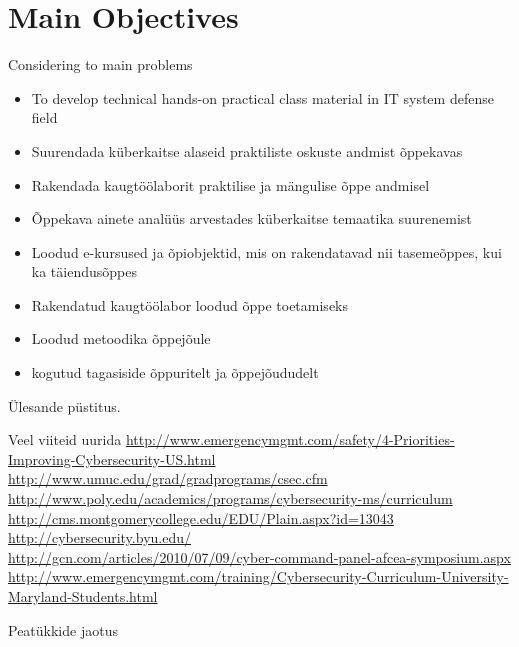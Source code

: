 \section{Main Objectives}
Considering to main problems
\begin{itemize}
	\item To develop technical hands-on practical class material in IT system defense field
	\item Suurendada küberkaitse alaseid praktiliste oskuste andmist õppekavas
	\item Rakendada kaugtöölaborit praktilise ja mängulise õppe andmisel
\end{itemize}


\begin{itemize}
	\item Õppekava ainete analüüs arvestades küberkaitse temaatika suurenemist
	\item Loodud e-kursused ja õpiobjektid, mis on rakendatavad nii tasemeõppes, kui ka täiendusõppes
	\item Rakendatud kaugtöölabor loodud õppe toetamiseks
	\item Loodud metoodika õppejõule
	\item kogutud tagasiside õppuritelt ja õppejõududelt
\end{itemize}

Ülesande püstitus.

Veel viiteid uurida 
\url{http://www.emergencymgmt.com/safety/4-Priorities-Improving-Cybersecurity-US.html}\\
\url{http://www.umuc.edu/grad/gradprograms/csec.cfm}
\\
\url{http://www.poly.edu/academics/programs/cybersecurity-ms/curriculum}\\
\url{http://cms.montgomerycollege.edu/EDU/Plain.aspx?id=13043}\\
\url{http://cybersecurity.byu.edu/}\\
\url{http://gcn.com/articles/2010/07/09/cyber-command-panel-afcea-symposium.aspx}\\
\url{http://www.emergencymgmt.com/training/Cybersecurity-Curriculum-University-Maryland-Students.html}\\

\par Peatükkide jaotus